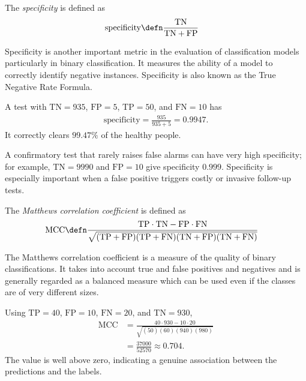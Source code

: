 \documentclass[a4paper, 12pt]{book}
\begin{document}
\begin{definition}
    The \emph{specificity} is defined as
    \begin{align}
        \mathrm{specificity} &\defn \frac{\mathrm{TN}}{\mathrm{TN}+\mathrm{FP}}
    \end{align}
\end{definition}
Specificity is another important metric in the evaluation of classification models particularly in binary classification. It measures the ability of a model to correctly identify negative instances. Specificity is also known as the True Negative Rate Formula.
\begin{example}
    A test with $\mathrm{TN}=935$, $\mathrm{FP}=5$, $\mathrm{TP}=50$, and
    $\mathrm{FN}=10$ has
    \begin{align}
        \mathrm{specificity} = \frac{935}{935+5} = 0.9947.
    \end{align}
    It correctly clears $99.47\%$ of the healthy people.
\end{example}

\begin{example}
    A confirmatory test that rarely raises false alarms can have very high
    specificity; for example, $\mathrm{TN}=9990$ and $\mathrm{FP}=10$ give
    specificity $0.999$. Specificity is especially important when a false
    positive triggers costly or invasive follow-up tests.
\end{example}

\begin{definition}
    The \emph{Matthews correlation coefficient} is defined as
    \begin{align}
        \mathrm{MCC} &\defn \frac{\mathrm{TP} \cdot \mathrm{TN} - \mathrm{FP} \cdot \mathrm{FN}}{\sqrt{(\mathrm{TP} + \mathrm{FP})(\mathrm{TP} + \mathrm{FN})(\mathrm{TN} + \mathrm{FP})(\mathrm{TN} + \mathrm{FN})}}
    \end{align}
\end{definition}
The Matthews correlation coefficient is a measure of the quality of binary classifications. It takes into account true and false positives and negatives and is generally regarded as a balanced measure which can be used even if the classes are of very different sizes.
\begin{example}
    Using $\mathrm{TP}=40$, $\mathrm{FP}=10$, $\mathrm{FN}=20$, and
    $\mathrm{TN}=930$,
    \begin{align}
        \mathrm{MCC}
        &= \frac{40\cdot930 - 10\cdot20}
                {\sqrt{(50)(60)(940)(980)}} \\
        &= \frac{37000}{52570} \approx 0.704.
    \end{align}
    The value is well above zero, indicating a genuine association between the
    predictions and the labels.
\end{example}
\end{document}

